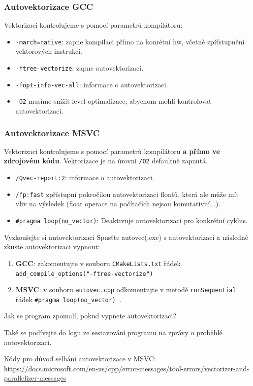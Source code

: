 \documentclass[usenames,dvipsnames,9pt]{beamer}
\begin{document}
\begin{frame}
\frametitle{Autovektorizace GCC}

Vektorizaci kontrolujeme s pomocí parametrů kompilátoru:

\begin{itemize}
    \item \texttt{-march=native}: zapne kompilaci přímo na konrétní hw, včetně zpřístupnění vektorových instrukcí.
    \item \texttt{-ftree-vectorize}: zapne autovektorizaci.
    \item \texttt{-fopt-info-vec-all}: informace o autovektorizaci.
    \item \texttt{-O2} musíme snížit level optimalizace, abychom mohli kontrolovat autovektorizaci.
\end{itemize}

\end{frame}


\begin{frame}
\frametitle{Autovektorizace MSVC}

Vektorizaci kontrolujeme s pomocí parametrů kompilátoru \textbf{a přímo ve zdrojovém kódu}. Vektorizace je na úrovni \texttt{/O2} defaultně zapnutá.

\begin{itemize}
    \item \texttt{/Qvec-report:2}: informace o autovektorizaci.
    \item \texttt{/fp:fast} zpřístupní pokročilou autovektorizaci floatů, která ale může mít vliv na výsledek (float operace na počítačích nejsou komutativní...).
    \item \texttt{\#pragma loop(no\_vector)}: Deaktivuje autovektorizaci pro konkrétní cyklus.
\end{itemize}
    
\end{frame}

{
\begin{frame}
  \begin{block}{Vyzkoušejte si autovektorizaci}
    Spusťte autovec(.exe) s autovektorizací a následně zkuste autovektorizaci vypnout:
    \begin{enumerate}
      \item {\Large\textbf{GCC}}: zakomentujte v souboru \texttt{CMakeLists.txt} řádek \texttt{add\_compile\_options("-ftree-vectorize")}
      \item {\Large\textbf{MSVC}}: v souboru \texttt{autovec.cpp} odkomentujte v metodě \texttt{runSequential} řádek \texttt{\#pragma loop(no\_vector) }.
    \end{enumerate}
    Jak se program zpomalí, pokud vypnete autovektorizaci?
  \end{block}
  Také se podívejte do logu ze sestavování programu na zprávy o proběhlé autovektorizaci.
  
   {\small
  Kódy pro důvod selhání autovektorizace v MSVC: \url{https://docs.microsoft.com/en-us/cpp/error-messages/tool-errors/vectorizer-and-parallelizer-messages}}
  
\end{frame}
}
\end{document}

